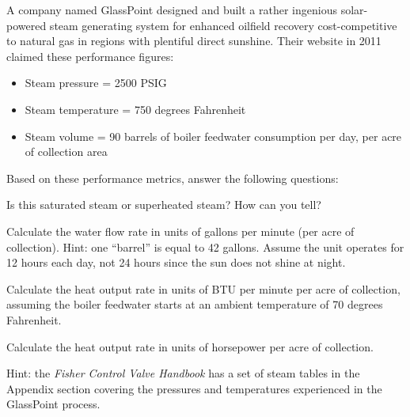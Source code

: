 

A company named GlassPoint designed and built a rather ingenious solar-powered steam generating system for enhanced oilfield recovery cost-competitive to natural gas in regions with plentiful direct sunshine.  Their website in 2011 claimed these performance figures:

\begin{itemize}
\item{} Steam pressure = 2500 PSIG
\item{} Steam temperature = 750 degrees Fahrenheit
\item{} Steam volume = 90 barrels of boiler feedwater consumption per day, per acre of collection area
\end{itemize}

Based on these performance metrics, answer the following questions:

\vskip 10pt

\noindent
Is this saturated steam or superheated steam?  How can you tell?

\vskip 10pt

\noindent
Calculate the water flow rate in units of gallons per minute (per acre of collection).  Hint: one ``barrel'' is equal to 42 gallons.  Assume the unit operates for 12 hours each day, not 24 hours since the sun does not shine at night.

\vskip 10pt

\noindent
Calculate the heat output rate in units of BTU per minute per acre of collection, assuming the boiler feedwater starts at an ambient temperature of 70 degrees Fahrenheit. 

\vskip 10pt

\noindent
Calculate the heat output rate in units of horsepower per acre of collection. 

\vskip 10pt

Hint: the {\it Fisher Control Valve Handbook} has a set of steam tables in the Appendix section covering the pressures and temperatures experienced in the GlassPoint process.

\vskip 10pt








